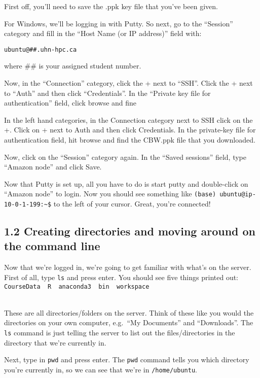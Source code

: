 \documentclass[
]{book}
\begin{document}
First off, you'll need to save the .ppk key file that you've been given.

For Windows, we'll be logging in with Putty. So next, go to the ``Session'' category and fill in the ``Host Name (or IP address)'' field with:

\begin{verbatim}
ubuntu@##.uhn-hpc.ca
\end{verbatim}

where \#\# is your assigned student number.

Now, in the ``Connection'' category, click the + next to ``SSH''. Click the + next to ``Auth'' and then click ``Credentials''. In the ``Private key file for authentication'' field, click browse and fine

In the left hand categories, in the Connection category next to SSH click on the +. Click on + next to Auth and then click Credentials. In the private-key file for authentication field, hit browse and find the CBW.ppk file that you downloaded.

Now, click on the ``Session'' category again. In the ``Saved sessions'' field, type ``Amazon node'' and click Save.

Now that Putty is set up, all you have to do is start putty and double-click on ``Amazon node'' to login. Now you should see something like \texttt{(base)\ ubuntu@ip-10-0-1-199:\textasciitilde{}\$} to the left of your cursor. Great, you're connected!

\subsection{1.2 Creating directories and moving around on the command line}\label{creating-directories-and-moving-around-on-the-command-line}

Now that we're logged in, we're going to get familiar with what's on the server. First of all, type \texttt{ls} and press enter. You should see five things printed out:\\
\texttt{CourseData\ \ R\ \ anaconda3\ \ bin\ \ workspace}\strut \\

These are all directories/folders on the server. Think of these like you would the directories on your own computer, e.g.~``My Documents'' and ``Downloads''. The \texttt{ls} command is just telling the server to list out the files/directories in the directory that we're currently in.

Next, type in \texttt{pwd} and press enter. The \texttt{pwd} command tells you which directory you're currently in, so we can see that we're in \texttt{/home/ubuntu}.
\end{document}
